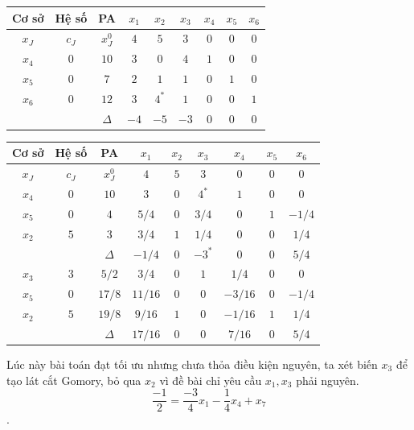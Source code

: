 \documentclass[12pt,a4paper]{report}
\begin{document}
    \begin{center}
        \begin{tabular}{|c|c|c|c|c|c|c|c|c|}
        \hline
         Cơ sở & Hệ số & PA& $x_1$ &$x_2$ &$x_3$ &$x_4$ &$x_5$ &$x_6$  \\
         \hline
          $x_J$& $c_J$ &$x_J^0$ &$4$ &$5$ &$ 3$ &$0$ &$0$ &$0$\\
          \hline
          $x_4$ &$0$ &$10$ &$3$ &$0$ &$4$ &$1$ &$0$ &$0$\\
          $x_5$ &$0$ &$7$ &$2$ &$1$ &$1$ &$0$ &$1$ &$0$\\
          $x_6$ &$0$ &$12$ &$3$ &$4^*$ &$1$ &$0$ &$0$ &$1$\\
          \hline
          &&$\Delta$ &$-4$ &$-5$ &$-3$ &$0$ &$0$ &$0$\\
          \hline
      \end{tabular}
    \end{center}    
    \begin{center}
        \begin{tabular}{|c|c|c|c|c|c|c|c|c|}
        \hline
          Cơ sở & Hệ số & PA& $x_1$ &$x_2$ &$x_3$ &$x_4$ &$x_5$ &$x_6$  \\
         \hline
          $x_J$& $c_J$ &$x_J^0$ &$4$ &$5$ &$ 3$ &$0$ &$0$ &$0$\\
          \hline    
          $x_4$ & $0$ &$10$ &$3$ &$0$ &$4^*$ &$1$ &$0$ &$0$ \\
          $x_5$ &$0$ &$4$ &$5/4$ &$0$ &$3/4$ &$0$ &$1$ &$-1/4$\\
          $x_2$ &$5$ &$3$ &$3/4$ &$1$ &$1/4$ &$0$ &$0$ &$1/4$\\
          \hline
          &&$\Delta$ &$-1/4$ &$0$ &$-3^*$ &$0$ &$0$ &$5/4$\\
          \hline
          $x_3$ &$3$ &$5/2$ &$3/4$ &$0$ &$1$ &$1/4$ &$0$ &$0$\\
          $x_5$ &$0$ &$17/8$ &$11/16$ &$0$ &$0$ &$-3/16$ &$0$ &$-1/4$\\
          $x_2$ &$5$ &$19/8$ &$9/16$ &$1$ &$0$ &$-1/16$ &$1$ &$1/4$\\
          \hline
          &&$\Delta$ &$17/16$ &$0$ &$0$ &$7/16$ &$0$ &$5/4$\\
          \hline
         \end{tabular}
    \end{center}
    Lúc này bài toán đạt tối ưu nhưng chưa thỏa điều kiện nguyên, ta xét biến $x_3$ để tạo lát cắt Gomory, bỏ qua $x_2$ vì đề bài chỉ yêu cầu $x_1,x_3$ phải nguyên.
    $$\dfrac{-1}{2}=\dfrac{-3}{4}x_1 -\dfrac{1}{4}x_4 +x_7$$.
\end{document}
